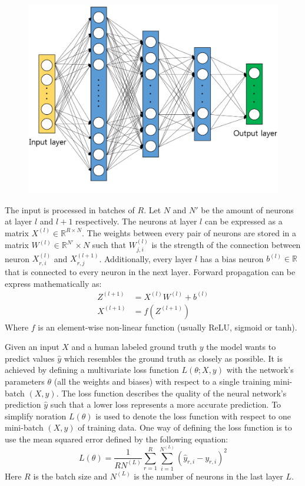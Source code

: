 \documentclass[17pt]{extarticle}
\begin{document}
\vfill
\begin{figure}[h]
	\centering %
  		\includegraphics[scale=1.49]{entropy-19-00454-g002.png}
\end{figure}


\newpage

The input is processed in batches of $R$. Let $N$ and $N'$ be the amount of neurons at layer $l$ and $l+1$ respectively. The neurons at layer $l$ can be expressed as a matrix $X^{(l)} \in \mathbb{R}^{R \times N}$. The weights between every pair of neurons are stored in a matrix $W^{(l)} \in \mathbb{R}^{N'}  \times N$ such that $W_{j, i}^{(l)}$ is the strength of the connection between neuron $X_{r, i}^{(l)}$ and $X_{r, j}^{(l+1)}$. Additionally, every layer $l$ has a bias neuron $b^{(l)} \in \mathbb{R}$ that is connected to every neuron in the next layer. Forward propagation can be express mathematically as:
\begin{align*}
Z^{(l+1)} & = X^{(l)}W^{(l)}+b^{(l)}\\
X^{(l+1)} & = f(Z^{(l+1)})
\end{align*}
Where $f$ is an element-wise non-linear function (usually ReLU, sigmoid or tanh).

Given an input $X$ and a human labeled ground truth $y$ the model wants to predict values $\hat{y}$ which resembles the ground truth as closely as possible. It is achieved by defining a multivariate loss function $L(\theta; X, y)$  with the network's parameters $\theta$ (all the weights and biases) with respect to a single training mini-batch $(X, y)$. The loss function describes the quality of the neural network's prediction $\hat{y}$ such that a lower loss represents a more accurate prediction. To simplify noration $L(\theta)$ is used to denote the loss function with respect to one mini-batch $(X, y)$ of training data. One way of defining the loss function is to use the mean squared error defined by the following equation:
\begin{equation}\label{MSE}
L(\theta) = \frac{1}{RN^{(L)}} \sum^{R}_{r=1} \sum^{N^{(L)}}_{i=1} (\hat{y}_{r,i}-y_{r,i})^2
\end{equation}
Here $R$ is the batch size and $N^{(L)}$ is the number of neurons in the last layer $L$.
\end{document}
